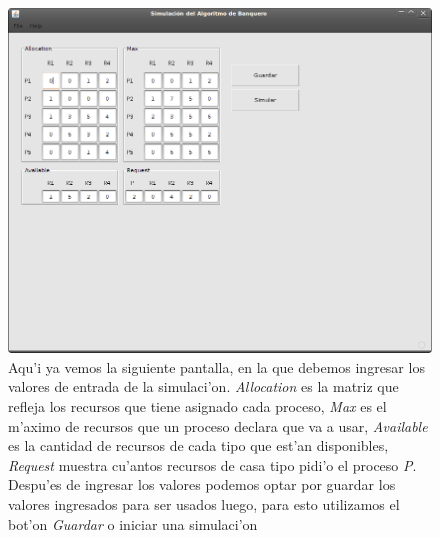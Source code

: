 \begin{figure}[h!]
\begin{center}
 \includegraphics[scale=0.3,keepaspectratio=true]{./imagenes/banquero/banquero2.png}
 \caption{Aqu'i ya vemos la siguiente pantalla, en la que debemos ingresar los valores de entrada de la simulaci'on. \emph{Allocation} es la matriz que refleja los recursos que tiene asignado cada proceso, \emph{Max} es el m'aximo de recursos que un proceso declara que va a usar, \emph{Available} es la cantidad de recursos de cada tipo que est'an disponibles, \emph{Request} muestra cu'antos recursos de casa tipo pidi'o el proceso \emph{P}. Despu'es de ingresar los valores podemos optar por guardar los valores ingresados para ser usados luego, para esto utilizamos el bot'on \emph{Guardar} o iniciar una simulaci'on}
\end{center}
\end{figure}
\newpage
